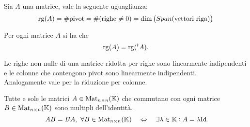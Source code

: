 \begin{thm}
	Sia $A$ una matrice, vale la seguente uguaglianza:
	\[ \operatorname{rg}(A) = \#\text{pivot} = \#\text{(righe $\ne 0$)} = \dim \left ( Span (\text{vettori riga} ) \right ) \]
\end{thm}

\begin{corollary}
	Per ogni matrice $A$ si ha che \[ \operatorname{rg}(A) = \operatorname{rg}(^t A).\]
\end{corollary}

\begin{prop}
	Le righe non nulle di una matrice ridotta per righe sono linearmente indipendenti e le colonne che contengono pivot sono linearmente indipendenti. \\
	Analogamente vale per la riduzione per colonne. 
\end{prop}

\begin{fatto}
	Tutte e sole le matrici $ A \in \mathrm{Mat}_{n \times n}(\mathbb{K}) $ che commutano con ogni matrice $ B \in  \mathrm{Mat}_{n \times n}(\mathbb{K}) $ sono multipli dell'identità. \[AB = BA, \ \forall B \in \mathrm{Mat}_{n \times n}(\K) \quad \iff \quad \exists \lambda \in \K : A = \lambda \Id\]
\end{fatto}

